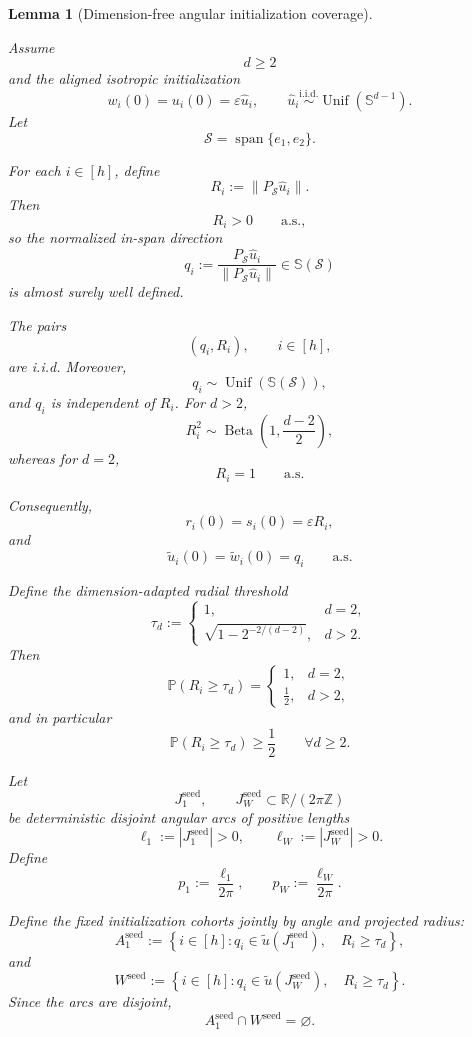 \documentclass{article} %
\theoremstyle{plain}
\newtheorem{lemma}[theorem]{Lemma}
\theoremstyle{definition}
\theoremstyle{remark}
\begin{document}
\begin{lemma}[Dimension-free angular initialization coverage]
\label{lem:init-angular-coverage}

Assume
\[
d\ge2
\]
and the aligned isotropic initialization
\[
w_i(0)
=
u_i(0)
=
\varepsilon\widehat u_i,
\qquad
\widehat u_i
\stackrel{\mathrm{i.i.d.}}{\sim}
\operatorname{Unif}(\mathbb S^{d-1}).
\]
Let
\[
\mathcal S
=
\operatorname{span}\{e_1,e_2\}.
\]

For each $i\in[h]$, define
\[
R_i
:=
\|P_{\mathcal S}\widehat u_i\|.
\]
Then
\[
R_i>0
\qquad
\text{a.s.},
\]
so the normalized in-span direction
\[
q_i
:=
\frac{
P_{\mathcal S}\widehat u_i
}{
\|P_{\mathcal S}\widehat u_i\|
}
\in
\mathbb S(\mathcal S)
\]
is almost surely well defined.

The pairs
\[
(q_i,R_i),
\qquad
i\in[h],
\]
are i.i.d. Moreover,
\[
q_i
\sim
\operatorname{Unif}(\mathbb S(\mathcal S)),
\]
and $q_i$ is independent of $R_i$. For $d>2$,
\[
\boxed{
R_i^2
\sim
\operatorname{Beta}
\left(
1,\frac{d-2}{2}
\right),
}
\]
whereas for $d=2$,
\[
R_i=1
\qquad
\text{a.s.}
\]

Consequently,
\[
r_i(0)
=
s_i(0)
=
\varepsilon R_i,
\]
and
\[
\boxed{
\widetilde u_i(0)
=
\widetilde w_i(0)
=
q_i
}
\qquad
\text{a.s.}
\]

Define the dimension-adapted radial threshold
\[
\boxed{
\tau_d
:=
\begin{cases}
1,
&
d=2,
\\[2mm]
\sqrt{
1-2^{-2/(d-2)}
},
&
d>2.
\end{cases}
}
\]
Then
\[
\mathbb P(R_i\ge\tau_d)
=
\begin{cases}
1,
&
d=2,
\\[1mm]
\frac12,
&
d>2,
\end{cases}
\]
and in particular
\[
\boxed{
\mathbb P(R_i\ge\tau_d)
\ge
\frac12
}
\qquad
\forall d\ge2.
\]

Let
\[
J_1^{\mathrm{seed}},
\qquad
J_W^{\mathrm{seed}}
\subset
\mathbb R/(2\pi\mathbb Z)
\]
be deterministic disjoint angular arcs of positive lengths
\[
\ell_1
:=
|J_1^{\mathrm{seed}}|>0,
\qquad
\ell_W
:=
|J_W^{\mathrm{seed}}|>0.
\]
Define
\[
p_1
:=
\frac{\ell_1}{2\pi},
\qquad
p_W
:=
\frac{\ell_W}{2\pi}.
\]

Define the fixed initialization cohorts jointly by angle and projected
radius:
\[
\boxed{
A_1^{\mathrm{seed}}
:=
\left\{
i\in[h]:
q_i\in\widetilde u(J_1^{\mathrm{seed}}),
\quad
R_i\ge\tau_d
\right\},
}
\]
and
\[
\boxed{
W^{\mathrm{seed}}
:=
\left\{
i\in[h]:
q_i\in\widetilde u(J_W^{\mathrm{seed}}),
\quad
R_i\ge\tau_d
\right\}.
}
\]
Since the arcs are disjoint,
\[
\boxed{
A_1^{\mathrm{seed}}
\cap
W^{\mathrm{seed}}
=
\varnothing.
}
\]


\end{lemma}
\end{document}
